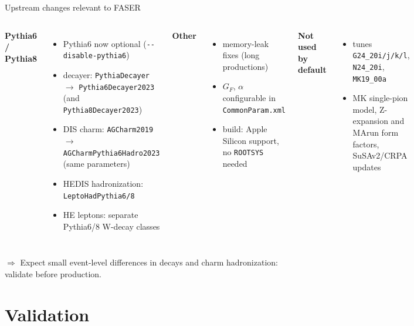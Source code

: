 \documentclass[10pt,aspectratio=169]{beamer}
\newcommand{\code}[1]{\texttt{\small #1}}
\begin{document}
\begin{frame}{Upstream changes relevant to FASER}
  \begin{columns}[T]
    \textbf{Pythia6 / Pythia8}
    \begin{itemize}\small
      \item Pythia6 now optional (\code{-{}-disable-pythia6})
      \item decayer: \code{PythiaDecayer} $\rightarrow$ \code{Pythia6Decayer2023}\\ (and \code{Pythia8Decayer2023})
      \item DIS charm: \code{AGCharm2019} $\rightarrow$ \code{AGCharmPythia6Hadro2023}\\ (same parameters)
      \item HEDIS hadronization: \code{LeptoHadPythia6/8}
      \item HE leptons: separate Pythia6/8 W-decay classes
    \end{itemize}
    \textbf{Other}
    \begin{itemize}\small
      \item memory-leak fixes (long productions)
      \item $G_F$, $\alpha$ configurable in \code{CommonParam.xml}
      \item build: Apple Silicon support, no \code{ROOTSYS} needed
    \end{itemize}
    \textbf{Not used by default}
    \begin{itemize}\small
      \item tunes \code{G24\_20i/j/k/l}, \code{N24\_20i}, \code{MK19\_00a}
      \item MK single-pion model, Z-expansion and MArun form factors, SuSAv2/CRPA updates
    \end{itemize}
  \end{columns}
  \vfill
  \small $\Rightarrow$ Expect small event-level differences in decays and charm hadronization: validate before production.
\end{frame}

\section{Validation}
\end{document}

